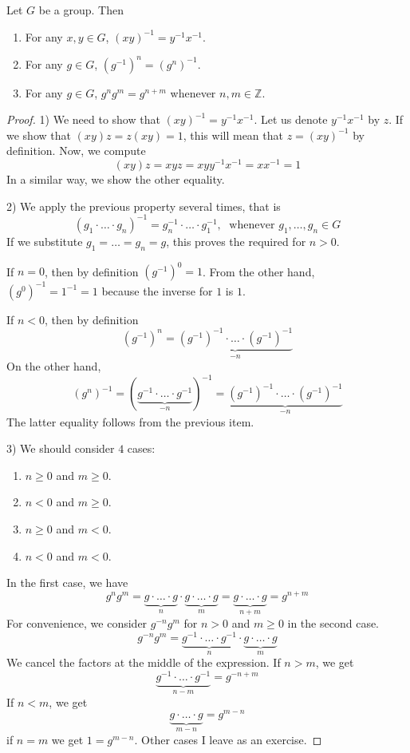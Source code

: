 \begin{claim}
Let $G$ be a group.
Then
\begin{enumerate}
\item For any $x,y\in G$, $(xy)^{-1} = y^{-1}x^{-1}$.

\item For any $g\in G$, $(g^{-1})^n = (g^n)^{-1}$.

\item For any $g\in G$, $g^n g^m = g^{n+m}$ whenever $n,m\in \mathbb Z$.
\end{enumerate}
\end{claim}
\begin{proof}
1) We need to show that $(xy)^{-1} = y^{-1}x^{-1}$.
Let us denote $ y^{-1}x^{-1}$ by $z$.
If we show that $(xy)z = z(xy) = 1$, this will mean that $z = (xy)^{-1}$ by definition.
Now, we compute
\[
(xy) z = xy z = xy y^{-1}x^{-1} = x x^{-1} = 1
\]
In a similar way, we show the other equality.

2) We apply the previous property several times, that is
\[
(g_1\cdot \ldots \cdot g_n)^{-1} = g_n^{-1}\cdot\ldots\cdot g_1^{-1},\;\text{ whenever }g_1,\ldots,g_n\in G
\]
If we substitute $g_1 =\ldots = g_n = g$, this proves the required for $n > 0$.

If $n = 0$, then by definition $(g^{-1})^0 = 1$.
From the other hand, $(g^0)^{-1} = 1^{-1} = 1$ because the inverse for $1$ is $1$.

If $n < 0$, then by definition
\[
(g^{-1})^n = \underbrace{(g^{-1})^{-1}\cdot\ldots \cdot (g^{-1})^{-1}}_{-n}
\]
On the other hand, 
\[
(g^n)^{-1} = (\underbrace{g^{-1}\cdot \ldots \cdot g^{-1}}_{-n})^{-1} = \underbrace{(g^{-1})^{-1}\cdot\ldots \cdot (g^{-1})^{-1}}_{-n}
\]
The latter equality follows from the previous item.

3) We should consider $4$ cases:
\begin{enumerate}
\item $n\geqslant 0$ and $m\geqslant 0$.

\item $n < 0$ and $m\geqslant 0$.

\item $n\geqslant 0$ and $m < 0$.

\item $n < 0$ and $m < 0$.
\end{enumerate}
In the first case, we have
\[
g^n g^m = \underbrace{g\cdot \ldots \cdot g}_n\cdot\underbrace{g\cdot \ldots \cdot g}_m = \underbrace{g\cdot \ldots \cdot g}_{n+m} = g^{n+m}
\]
For convenience, we consider $g^{-n} g^{m}$ for $n>0$ and $m\geqslant 0$ in the second case.
\[
g^{-n}g^{m} = \underbrace{g^{-1}\cdot \ldots \cdot g^{-1}}_{n}\cdot\underbrace{g\cdot \ldots \cdot g}_m
\]
We cancel the factors at the middle of the expression.
If $n >m$, we get
\[
\underbrace{g^{-1}\cdot \ldots \cdot g^{-1}}_{n - m} = g^{-n + m}
\]
If $n < m$, we get
\[
\underbrace{g\cdot \ldots \cdot g}_{m - n} = g^{m - n}
\]
if $n = m$ we get $1 = g^{m - n}$.
Other cases I leave as an exercise.
\end{proof}


